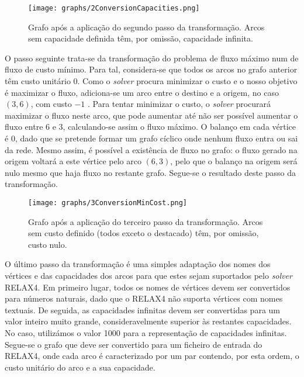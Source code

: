 \documentclass[12pt, a4paper, titlepage]{article}
\begin{document}
\begin{figure}[H]
    \centering
    \texttt{[image: graphs/2ConversionCapacities.png]}
    \caption{Grafo após a aplicação do segundo passo da transformação. Arcos sem capacidade
        definida têm, por omissão, capacidade infinita.}
    \label{2conversion-graph}
\end{figure}

O passo seguinte trata-se da transformação do problema de fluxo máximo num de fluxo de custo mínimo.
Para tal, considera-se que todos os arcos no grafo anterior têm custo unitário 0. Como o
\emph{solver} procura minimizar o custo e o nosso objetivo é maximizar o fluxo, adiciona-se um arco
entre o destino e a origem, no caso $(3, 6)$, com custo $-1$ \cite{book}. Para tentar minimizar o
custo, o \emph{solver} procurará maximizar o fluxo neste arco, que pode aumentar até não ser
possível aumentar o fluxo entre 6 e 3, calculando-se assim o fluxo máximo. O balanço em cada vértice
é 0, dado que se pretende formar um grafo cíclico onde nenhum fluxo entra ou sai da rede. Mesmo
assim, é possível a existência de fluxo no grafo: o fluxo gerado na origem voltará a este vértice
pelo arco $(6, 3)$, pelo que o balanço na origem será nulo mesmo que haja fluxo no restante grafo.
Segue-se o resultado deste passo da transformação.

\begin{figure}[H]
    \centering
    \texttt{[image: graphs/3ConversionMinCost.png]}
    \caption{ \onehalfspacing
        Grafo após a aplicação do terceiro passo da transformação. Arcos sem custo definido (todos
        exceto o destacado) têm, por omissão, custo nulo.}
    \label{3conversion-graph}
\end{figure}

O último passo da transformação é uma simples adaptação dos nomes dos vértices e das capacidades dos
arcos para que estes sejam suportados pelo \emph{solver} RELAX4. Em primeiro lugar, todos os nomes
de vértices devem ser convertidos para números naturais, dado que o RELAX4 não suporta vértices com
nomes textuais. De seguida, as capacidades infinitas devem ser convertidas para um valor inteiro
muito grande, consideravelmente superior às restantes capacidades. No caso, utilizámos o valor 1000
para a representação de capacidades infinitas. Segue-se o grafo que deve ser convertido para um
ficheiro de entrada do RELAX4, onde cada arco é caracterizado por um par contendo, por esta ordem, o
custo unitário do arco e a sua capacidade.
\end{document}
